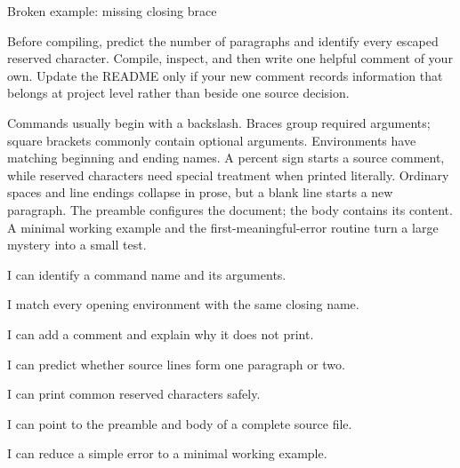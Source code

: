 \begin{latexcode}{Broken example: missing closing brace}
\begin{miniproject}
Before compiling, predict the number of paragraphs and identify every escaped
reserved character. Compile, inspect, and then write one helpful comment of
your own. Update the README only if your new comment records information that
belongs at project level rather than beside one source decision.
\end{miniproject}

\chaptersummary

Commands usually begin with a backslash. Braces group required arguments;
square brackets commonly contain optional arguments. Environments have
matching beginning and ending names. A percent sign starts a source comment,
while reserved characters need special treatment when printed literally.
Ordinary spaces and line endings collapse in prose, but a blank line starts a
new paragraph. The preamble configures the document; the body contains its
content. A minimal working example and the first-meaningful-error routine turn
a large mystery into a small test.

\chaptercheck

\begin{chapterchecklist}
  \item I can identify a command name and its arguments.
  \item I match every opening environment with the same closing name.
  \item I can add a comment and explain why it does not print.
  \item I can predict whether source lines form one paragraph or two.
  \item I can print common reserved characters safely.
  \item I can point to the preamble and body of a complete source file.
  \item I can reduce a simple error to a minimal working example.
\end{chapterchecklist}

\chapterexercisestitle


\end{latexcode}
